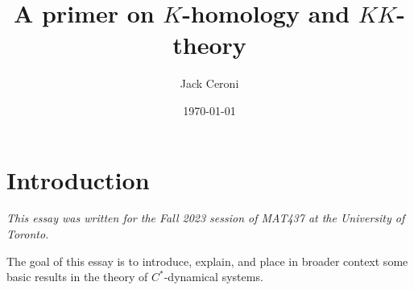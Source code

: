 \documentclass[aps,pra,showpacs,notitlepage,onecolumn,superscriptaddress,nofootinbib]{revtex4-1}
\newcommand{\hhrulefill}{\hspace{-1.0em}\hrulefill}
\theoremstyle{definition}
\newtheorem{definition}{Definition}[section]
\newtheorem{theorem}{Theorem}[section]
\begin{document}
\title{A primer on $K$-homology and $KK$-theory}
\author{Jack Ceroni}

\date{\today}

\maketitle

\section{Introduction}

\noindent \emph{This essay was written for the Fall 2023 session of MAT437 at the University of Toronto.}
\newline

\noindent The goal of this essay is to introduce, explain, and place in broader context some basic results in the theory of $C^{*}$-dynamical systems. 

\hhrulefill

\begin{comment}
\begin{theorem}[Atiyah-Singer index theorem]
  For an elliptic differential operator on a compact manifold, the analytical index is equal to the topological index.
\end{theorem}

\hhrulefill

\section{Building up to the index theorem}

\noindent The main goal of this section of the essay is to develop the necessary machinery in order to understand each individual concept utilized in the statement of the index
theorem. At a coarse-grained level, this will involve defining \emph{elliptic differential operators}, \emph{analytical index}, and \emph{topological index}. The first of these concepts
is simple.

\begin{definition}[Elliptic differential operator]
  We let $D$ be an order-$m$ differential operator on domain $\Omega \subset \mathbb{R}^{n}$, given by $Du = \sum_{|a| \leq m} f_{\alpha}(x) \partial^{\alpha} u$, where $u \in C^{\infty}(\Omega, \mathbb{R})$,
  where $\alpha = (\alpha_1, \dots, \alpha_n)$ with $\alpha_1 + \cdots + \alpha_n = m$ and $\partial^{\alpha} = \partial_1^{\alpha_1} \cdots \partial_{n}^{\alpha_n}$. The operator $D$ is said to be \emph{elliptic}
  if for every $x \in \Omega$ and non-zero $y \in \mathbb{R}$,
  \begin{equation}
    \displaystyle\sum_{\alpha = |m|} f_{\alpha}(x) y^{\alpha_1} \cdots y^{\alpha_n} \neq 0.
    \end{equation}
\end{definition}

\noindent As for the two notions of ``index'': these ideas are much more subtle and require substantial exposition.
\end{comment}
\end{document}
